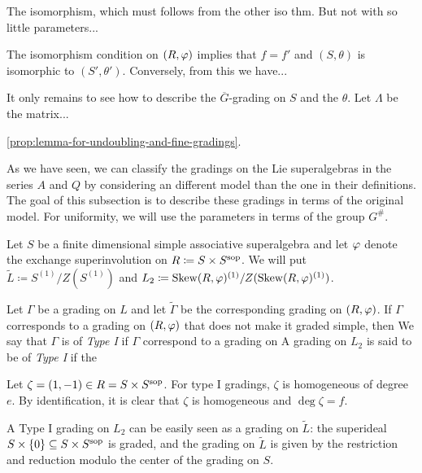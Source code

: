 \begin{thm}
    The isomorphism, which must follows from the other iso thm. 
    But not with so little parameters...
\end{thm}

The isomorphism condition on $(R, \varphi)$ implies that $f = f'$ and $(S, \theta)$ is isomorphic to $(S', \theta')$. 
Conversely, from this we have...

It only remains to see how to describe the $\overline{G}$-grading on $S$ and the $\theta$. 
Let $\Lambda$ be the matrix...

\cref{prop:lemma-for-undoubling-and-fine-gradings}.


\newpage


As we have seen, we can classify the gradings on the Lie superalgebras in the series $A$ and $Q$ by considering an different model than the one in their definitions. 
The goal of this subsection is to describe these gradings in terms of the original model. 
For uniformity, we will use the parameters in terms of the group $G^\#$. 

Let $S$ be a finite dimensional simple associative superalgebra and let $\varphi$ denote the exchange superinvolution on $R \coloneqq S\times S^{\mathrm{sop}}$. 
We will put $\tilde L \coloneqq S^{(1)}/Z(S^{(1)})$ and $L_2 \coloneqq \operatorname{Skew}(R, \varphi)^{(1)}/Z(\operatorname{Skew}(R, \varphi)^{(1)})$. 

\begin{defi}
    
\end{defi}


Let $\Gamma$ be a grading on $L$ and let $\tilde \Gamma$ be the corresponding grading on $(R, \varphi)$. 
    If $\Gamma$ corresponds to a grading on $(R, \varphi)$ that does not make it graded simple, then
    We say that $\Gamma$ is of \emph{Type I} if $\Gamma$ correspond to a grading on 
    A grading on $L_2$ is said to be of \emph{Type I} if the

Let $\zeta = (1, -1) \in R = S\times S^{\mathrm{sop}}$. 
For type I gradings, $\zeta$ is homogeneous of degree $e$. 
By identification, it is clear that $\zeta$ is homogeneous and $\deg \zeta = f$. 

A Type I grading on $L_2$ can be easily seen as a grading on $\tilde L$: the superideal $S\times \{ 0 \} \subseteq S\times S^{\mathrm{sop}}$ is graded, and the grading on $\tilde L$ is given by the restriction and reduction modulo the center of the grading on $S$. 


